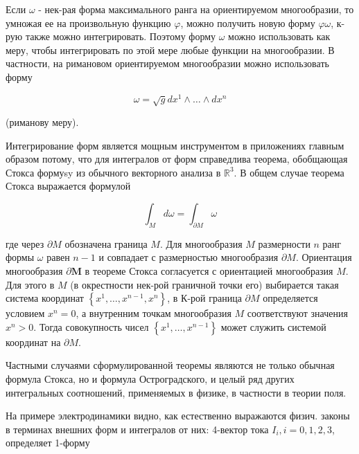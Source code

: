 \documentclass[10pt]{article}
\begin{document}
Если $\omega$ - нек-рая форма максимального ранга на ориентируемом многообразии, то умножая ее на произвольную функцию $\varphi$, можно получить новую форму $\varphi \omega$, к-рую также можно интегрировать. Поэтому форму $\omega$ можно использовать как меру, чтобы интегрировать по этой мере любые функции на многообразии. В частности, на римановом ориентируемом многообразии можно использовать форму



\[

\omega=\sqrt{g} d x^{1} \wedge \ldots \wedge d x^{n}

\]



(риманову меру).



Интегрирование форм является мощным инструментом в приложениях главным образом потому, что для интегралов от форм справедлива теорема, обобщающая Стокса формуsy из обычного векторного анализа в $\mathbb{R}^{3}$. В общем случае теорема Стокса выражается формулой



\[

\int_{M} d \omega=\int_{\partial M} \omega

\]



где через $\partial M$ обозначена граница $M$. Для многообразия $M$ размерности $n$ ранг формы $\omega$ равен $n-1$ и совпадает с размерностью многообразия $\partial M$. Ориентация многообразия $\partial \boldsymbol{M}$ в теореме Стокса согласуется с ориентацией многообразия $M$. Для этого в $M$ (в окрестности нек-рой граничной точки его) выбирается такая система координат $\left\{x^{1}, \ldots, x^{n-1}, x^{n}\right\}$, в К-рой граница $\partial M$ определяется условием $x^{n}=0$, а внутренним точкам многообразия $M$ соответствуют значения $x^{n}>0$. Тогда совокупность чисел $\left\{x^{1}, \ldots, x^{n-1}\right\}$ может служить системой координат на $\partial M$.



Частными случаями сформулированной теоремы являются не только обычная формула Стокса, но и формула Остроградского, и целый ряд других интегральных соотношений, применяемых в физике, в частности в теории поля.



На примере электродинамики видно, как естественно выражаются физич. законы в терминах внешних форм и интегралов от них: 4-вектор тока $I_{i}, i=0,1,2,3$, определяет 1-форму
\end{document}
